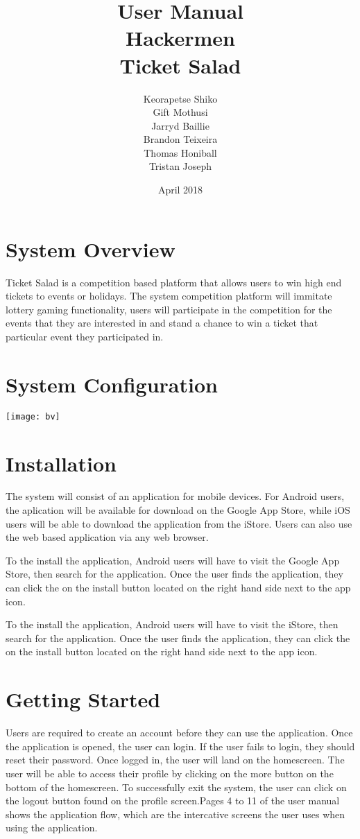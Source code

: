 \documentclass{article}
\title{User Manual \\ Hackermen \\ Ticket Salad}
\author{Keorapetse Shiko \\ Gift Mothusi
		 \\Jarryd Baillie \\ Brandon Teixeira 
		 \\Thomas Honiball \\ Tristan Joseph}
\date{April 2018}
\begin{document}
    
    \maketitle
    
    \clearpage
       
   
\section{System Overview}
Ticket Salad is a competition based platform that allows users to win high end tickets to events or holidays.
The system competition platform will immitate lottery gaming functionality, users will participate in the
 competition for the events that they are interested in and stand a chance to win a ticket that particular
 event they participated in.

\section{System Configuration}

\texttt{[image: bv]}

\section{Installation}
The system will consist of an application for mobile devices. For Android users, the aplication will be available
for download on the Google App Store, while iOS users will be able to download the application from the iStore.
Users can also use the web based application via any web browser.

To the install the application, Android users will have to visit the Google App Store, then search for the application.
 Once the user finds the application, they can click the on the install button located on the right hand side next to the app icon.  


 To the install the application, Android users will have to visit the iStore, then search for the application.
 Once the user finds the application, they can click the on the install button located on the right hand side next to the app icon. 



 \section{Getting Started}
 Users are required to create an account before they can use the application.
Once the application is opened, the user can login. If the user fails to login,
they should reset their password. Once logged in, the user will land on the homescreen.
The user will be able to access their profile by clicking on the more button on the 
bottom of the homescreen. To successfully exit the system, the user can click on the 
logout button found on the profile screen.Pages 4 to 11  of the user manual shows the application flow, which are the intercative screens the user uses when using the application.
\end{document}

